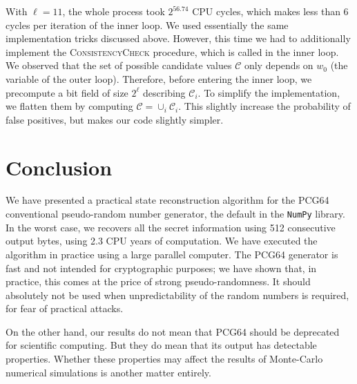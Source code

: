 \documentclass[submission,svgnames,journal=tosc]{iacrtrans}
\begin{document}
With $\ell=11$, the whole process took $2^{56.74}$ CPU cycles, which makes less
than 6 cycles per iteration of the inner loop. We used essentially the same
implementation tricks discussed above. However, this time we had to additionally
implement the \textsc{ConsistencyCheck} procedure, which is called in the inner
loop. We observed that the set of possible candidate values $\mathcal{C}$ only
depends on $w_0$ (the variable of the outer loop). Therefore, before entering
the inner loop, we precompute a bit field of size $2^\ell$ describing
$\mathcal{C}_i$. To simplify the implementation, we flatten them by computing
$\mathcal{C} = \cup_i \mathcal{C}_i$. This slightly increase the probability of
false positives, but makes our code slightly simpler.

\section{Conclusion}

We have presented a practical state reconstruction algorithm for the
\textsf{PCG64} conventional pseudo-random number generator, the default in the
\texttt{NumPy} library. In the worst case, we recovers all the secret
information using 512 consecutive output bytes, using 2.3 CPU years of
computation. We have executed the algorithm in practice using a large parallel
computer. The \textsf{PCG64} generator is fast and not intended for
cryptographic purposes; we have shown that, in practice, this comes at the price
of strong pseudo-randomness. It should absolutely not be used when
unpredictability of the random numbers is required, for fear of practical
attacks.

On the other hand, our results do not mean that \textsf{PCG64} should be
deprecated for scientific computing. But they do mean that its output has
detectable properties. Whether these properties may affect the results of
Monte-Carlo numerical simulations is another matter entirely.




\end{document}
